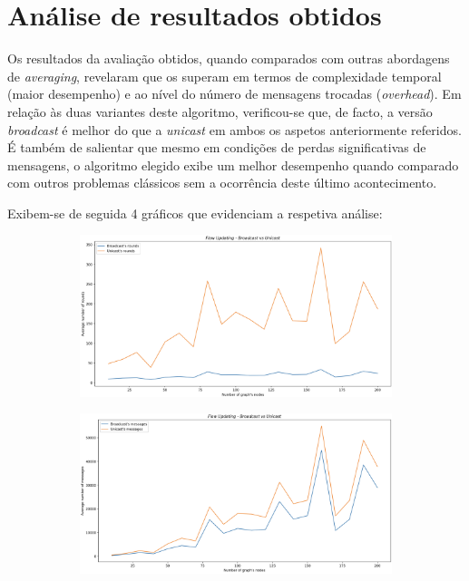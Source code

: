 \documentclass[a4paper]{article}
\begin{document}
\section{Análise de resultados obtidos} \label{sec:Analysis of results}
\large{
	Os resultados da avaliação obtidos, quando comparados com outras abordagens de \textit{averaging}, revelaram que os superam em termos de complexidade temporal (maior desempenho) e ao nível do número de mensagens trocadas (\textit{overhead}).
	Em relação às duas variantes deste algoritmo, verificou-se que, de facto, a versão \textit{broadcast} é melhor do que a \textit{unicast} em ambos os aspetos anteriormente referidos.
	É também de salientar que mesmo em condições de perdas significativas de mensagens, o algoritmo elegido exibe um melhor desempenho quando comparado com outros problemas clássicos sem a ocorrência deste último acontecimento.

	Exibem-se de seguida 4 gráficos que evidenciam a respetiva análise:
	\begin{figure}[H]
		\centering
		\begin{subfigure}[b]{1\textwidth}
			\includegraphics[width=1.0\textwidth]{Images/Plot1.png}
			\label{fig:1}
		\end{subfigure}
		\begin{subfigure}[b]{1\textwidth}
			\includegraphics[width=1.0\textwidth]{Images/Plot2.png}
			\label{fig:1}
		\end{subfigure}
	\end{figure}

}
\end{document}
